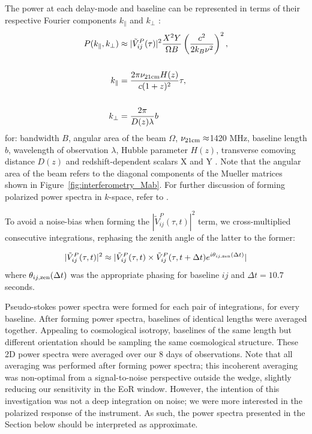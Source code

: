 The power at each delay-mode and baseline can be represented in terms of their respective Fourier components $k_{\parallel}$ and $k_{\perp}$ \citep{Parsons.12a, Nithya.15b}:
\begin{align*}
P(k_{\parallel},k_{\perp}) &\approx | \tilde{V}_{ij}^{P}(\tau) |^2 \frac{X^2 Y}{\Omega B} \left(\frac{c^2}{2k_B\nu^2}\right)^2 , \\\\
k_{\parallel} &= \frac{2\pi \nu_{\rm 21cm} H(z) %
}{c (1+z)^2}\tau, \\\\
k_{\perp} &= \frac{2\pi}{D(z) \lambda} b\\
\end{align*}
for: bandwidth $B$, angular area of the beam $\Omega$, $\nu_{\rm 21cm}\approx$1420 MHz, baseline length $b$, wavelength of observation $\lambda$, Hubble parameter $H(z)$, transverse comoving distance $D(z)$ and redshift-dependent scalars X and Y \citep{Parsons.12b}. Note that the angular area of the beam refers to the diagonal components of the Mueller matrices shown in Figure~\ref{fig:interferometry_Mab}. For further discussion of forming polarized power spectra in $k$-space, refer to \cite{Nunhokee.17}.

To avoid a noise-bias when forming the $ |\tilde{V}_{ij}^{P}(\tau, t) |^2$ term, we cross-multiplied consecutive integrations, rephasing the zenith angle of the latter to the former:

\begin{equation}
 | \tilde{V}_{ij}^{P}(\tau, t) |^2 \approx | \tilde{V}_{ij}^{P}(\tau, t) \times \tilde{V}_{ij}^{P}(\tau, t+\Delta t)e^{i\theta_{ij,\rm zen}(\Delta t)}|
\end{equation}
where $\theta_{ij,\rm zen}(\Delta t)$ was the appropriate phasing for baseline $ij$ and $\Delta t = 10.7$ seconds.

Pseudo-stokes power spectra were formed for each pair of integrations, for every baseline. After forming power spectra, baselines of identical lengths were averaged together. Appealing to cosmological isotropy, baselines of the same length but different orientation should be sampling the same cosmological structure. These 2D power spectra were averaged over our 8 days of observations. Note that all averaging was performed after forming power spectra; this incoherent averaging was non-optimal from a signal-to-noise perspective outside the wedge, slightly reducing our sensitivity in the EoR window. However, the intention of this investigation was not a deep integration on noise; we were more interested in the polarized response of the instrument. As such, the power spectra presented in the Section below should be interpreted as approximate.

